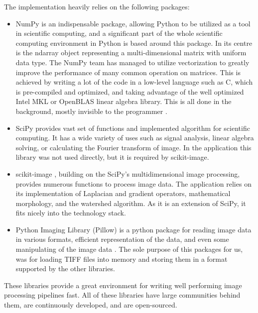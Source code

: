\documentclass[
  digital,     %
  oneside,     %
  nosansbold,  %
  nocolorbold, %
  lof,         %
  lot,         %
]{fithesis4}
\begin{document}
The implementation heavily relies on the following packages:
\begin{itemize}
    \item{NumPy \cite{harris2020array} is an indispensable package, allowing
        Python to be utilized as a tool in scientific computing, and a
        significant part of the whole scientific computing environment in Python
        is based around this package. In its centre is the ndarray object
        representing a multi-dimensional matrix with uniform data type. The
        NumPy team has managed to utilize vectorization to greatly improve the
        performance of many common operation on matrices. This is achieved by
        writing a lot of the code in a low-level language such as C, which is
        pre-compiled and optimized, and taking advantage of the well optimized
        Intel MKL or OpenBLAS linear algebra library. This is all done in the
        background, mostly invisible to the programmer \cite{numpyManual2022}.}
    \item{SciPy \cite{2020SciPy-NMeth} provides vast set of functions and
        implemented algorithm for scientific computing. It has a wide variety of
        uses such as signal analysis, linear algebra solving, or calculating the
        Fourier transform of image. In the application this library was not used
        directly, but it is required by scikit-image.}
    \item{scikit-image \cite{scikit-image}, building on the SciPy's
        multidimensional image processing, provides numerous functions to
        process image data. The application relies on its implementation of
        Laplacian and gradient operators, mathematical morphology, and the watershed
        algorithm. As it is an extension of SciPy, it fits nicely into the
        technology stack.}
    \item{Python Imaging Library (Pillow) is a python package for reading image
        data in various formats, efficient representation of the data, and even
        some manipulating of the image data \cite{clarkc20102023}. The sole
        purpose of this packages for us, was for loading TIFF files into memory
        and storing them in a format supported by the other libraries.}
\end{itemize}
These libraries provide a great environment for writing well performing image
processing pipelines fast. All of these libraries have large communities
behind them, are continuously developed, and are open-sourced.
\end{document}
